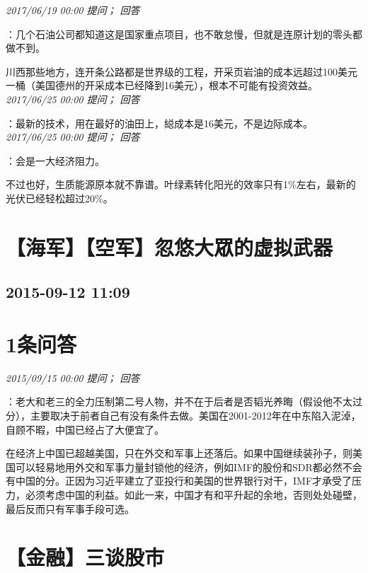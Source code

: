 \documentclass[twocolumn]{ctexart}
\begin{document}
\textit{\hfill\noindent\small 2017/06/19 00:00 提问； 回答}

：几个石油公司都知道这是国家重点项目，也不敢怠慢，但就是连原计划的零头都做不到。

川西那些地方，连开条公路都是世界级的工程，开采页岩油的成本远超过100美元一桶（美国德州的开采成本已经降到16美元），根本不可能有投资效益。\\

\textit{\hfill\noindent\small 2017/06/25 00:00 提问； 回答}

：最新的技术，用在最好的油田上，縂成本是16美元，不是边际成本。\\

\textit{\hfill\noindent\small 2017/06/25 00:00 提问； 回答}

：会是一大经济阻力。

不过也好，生质能源原本就不靠谱。叶绿素转化阳光的效率只有1\%左右，最新的光伏已经轻松超过20\%。\\


\section{【海军】【空军】忽悠大眾的虚拟武器}
\subsection{2015-09-12 11:09}


\section{1条问答}

\textit{\hfill\noindent\small 2015/09/15 00:00 提问； 回答}

：老大和老三的全力压制第二号人物，并不在于后者是否韬光养晦（假设他不太过分），主要取决于前者自己有没有条件去做。美国在2001-2012年在中东陷入泥淖，自顾不暇，中国已经占了大便宜了。

在经济上中国已超越美国，只在外交和军事上还落后。如果中国继续装孙子，则美国可以轻易地用外交和军事力量封锁他的经济，例如IMF的股份和SDR都必然不会有中国的分。正因为习近平建立了亚投行和美国的世界银行对干，IMF才承受了压力，必须考虑中国的利益。如此一来，中国才有和平升起的余地，否则处处碰壁，最后反而只有军事手段可选。\\


\section{【金融】三谈股市}
\end{document}
